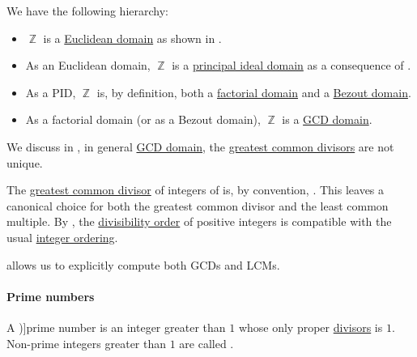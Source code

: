 \begin{remark}\label{rem:integer_domain_chain}
  We have the following hierarchy:
  \begin{itemize}
    \item \( \BbbZ \) is a \hyperref[def:euclidean_domain]{Euclidean domain} as shown in .
    \item As an Euclidean domain, \( \BbbZ \) is a \hyperref[def:principal_ideal_domain]{principal ideal domain} as a consequence of .
    \item As a PID, \( \BbbZ \) is, by definition, both a \hyperref[def:factorial_domain]{factorial domain} and a \hyperref[def:bezout_domain]{Bezout domain}.
    \item As a factorial domain (or as a Bezout domain), \( \BbbZ \) is a \hyperref[def:gcd_domain]{GCD domain}.
  \end{itemize}
\end{remark}

\begin{remark}\label{rem:integer_gcd}
  We discuss in , in general \hyperref[def:gcd_domain]{GCD domain}, the \hyperref[def:gcd]{greatest common divisors} are not unique.

  The \hyperref[def:gcd]{greatest common divisor} of integers of is, by convention, . This leaves a canonical choice for both the greatest common divisor and the least common multiple. By , the \hyperref[thm:semiring_divisibility_order]{divisibility order} of positive integers is compatible with the usual \hyperref[def:integer_ordering]{integer ordering}.

   allows us to explicitly compute both GCDs and LCMs.
\end{remark}

\paragraph{Prime numbers}

\begin{definition}\label{def:prime_number}
  A \term[ru=простое число (\cite[45]{Зорич2019АнализТом1})]{prime number} is an integer greater than \( 1 \) whose only  proper \hyperref[def:divisibility]{divisors} is \( 1 \). Non-prime integers greater than \( 1 \) are called .
\end{definition}


